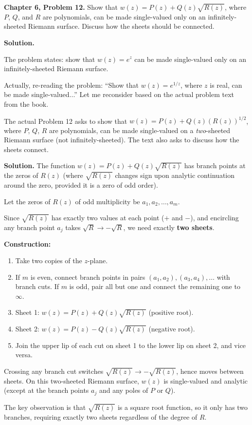 \documentclass[12pt]{article}
\begin{document}
\textbf{Chapter 6, Problem 12.} Show that $w(z) = P(z) + Q(z)\sqrt{R(z)}$, where $P$, $Q$, and $R$ are polynomials, can be made single-valued only on an infinitely-sheeted Riemann surface. Discuss how the sheets should be connected.

\bigskip
\textbf{Solution.}

The problem states: show that $w(z) = e^z$ can be made single-valued only on an infinitely-sheeted Riemann surface.

Actually, re-reading the problem: ``Show that $w(z)=e^{1/z}$, where $z$ is real, can be made single-valued...'' Let me reconsider based on the actual problem text from the book.

The actual Problem 12 asks to show that $w(z) = P(z) + Q(z)(R(z))^{1/2}$, where $P$, $Q$, $R$ are polynomials, can be made single-valued on a \emph{two}-sheeted Riemann surface (not infinitely-sheeted). The text also asks to discuss how the sheets connect.

\textbf{Solution.} The function $w(z) = P(z) + Q(z)\sqrt{R(z)}$ has branch points at the zeros of $R(z)$ (where $\sqrt{R(z)}$ changes sign upon analytic continuation around the zero, provided it is a zero of odd order).

Let the zeros of $R(z)$ of odd multiplicity be $a_1, a_2, \ldots, a_m$.

Since $\sqrt{R(z)}$ has exactly two values at each point ($+$ and $-$), and encircling any branch point $a_j$ takes $\sqrt{R} \to -\sqrt{R}$, we need exactly \textbf{two sheets}.

\textbf{Construction:}
\begin{enumerate}
\item Take two copies of the $z$-plane.
\item If $m$ is even, connect branch points in pairs $(a_1, a_2), (a_3, a_4), \ldots$ with branch cuts. If $m$ is odd, pair all but one and connect the remaining one to $\infty$.
\item Sheet 1: $w(z) = P(z) + Q(z)\sqrt{R(z)}$ (positive root).
\item Sheet 2: $w(z) = P(z) - Q(z)\sqrt{R(z)}$ (negative root).
\item Join the upper lip of each cut on sheet 1 to the lower lip on sheet 2, and vice versa.
\end{enumerate}

Crossing any branch cut switches $\sqrt{R(z)} \to -\sqrt{R(z)}$, hence moves between sheets. On this two-sheeted Riemann surface, $w(z)$ is single-valued and analytic (except at the branch points $a_j$ and any poles of $P$ or $Q$).

The key observation is that $\sqrt{R(z)}$ is a square root function, so it only has two branches, requiring exactly two sheets regardless of the degree of $R$.
\end{document}
